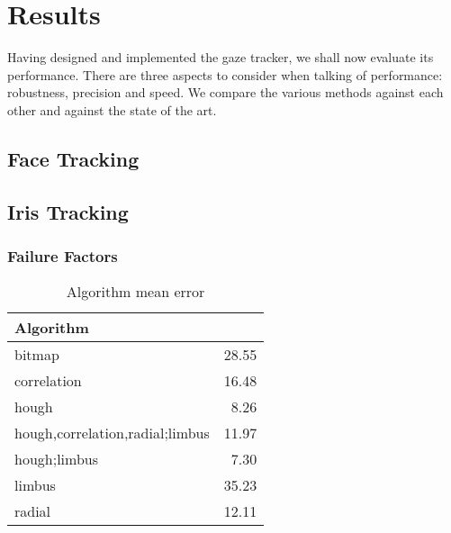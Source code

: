\chapter{Results}

Having designed and implemented the gaze tracker, we shall now evaluate its performance.
There are three aspects to consider when talking of performance: robustness, precision and speed.
We compare the various methods against each other and against the state of the art.

\section{Face Tracking}


\section{Iris Tracking}

\subsection{Failure Factors}


\begin{table}[b!]
\centering
\begin{tabular}{l@{\hspace{1.5cm}}D{.}{.}{3.2}}
\toprule
\textbf{Algorithm} &  \\
\midrule
bitmap & 28.55 \\
correlation & 16.48 \\
hough & 8.26 \\
hough,correlation,radial;limbus & 11.97 \\
hough;limbus & 7.30 \\
limbus & 35.23 \\
radial & 12.11 \\
\bottomrule
\end{tabular}
\caption{Algorithm mean error}\label{t:algo-mean}
\end{table}

